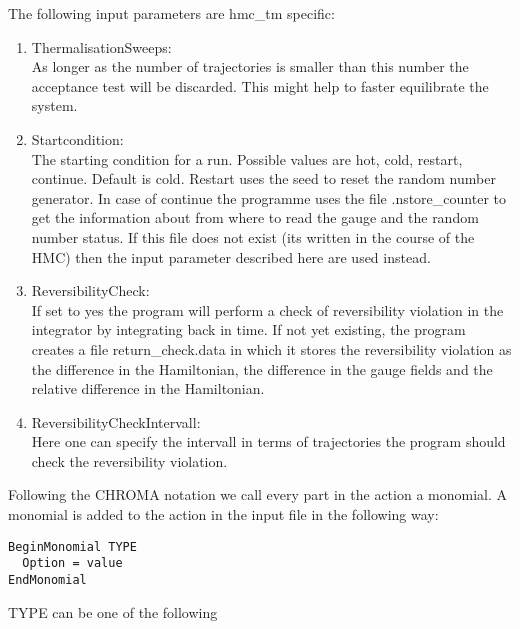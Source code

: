 The following input parameters are {\ttfamily hmc\_tm} specific:
\begin{enumerate}
\item {ThermalisationSweeps}:\\
  As longer as the number of trajectories is smaller than this number
  the acceptance test will be discarded. This might help to faster
  equilibrate the system.

\item {\ttfamily Startcondition}:\\
  The starting condition for a run. Possible values are {\ttfamily
    hot, cold, restart, continue}. Default is {\ttfamily
    cold}. Restart uses the seed to reset the random number
  generator. In case of {\ttfamily continue} the programme uses the
  file {\ttfamily .nstore\_counter} to get the information about from
  where to read the gauge and the random number status. If this file
  does not exist (its written in the course of the HMC) then the input
  parameter described here are used instead.

\item {\ttfamily ReversibilityCheck}:\\
  If set to {\ttfamily yes} the program will perform a check of
  reversibility violation in the integrator by integrating back in
  time. If not yet existing, the program creates a file {\ttfamily
    return\_check.data} in which it stores the reversibility violation
  as the difference in the Hamiltonian, the difference in the gauge
  fields and the relative difference in the Hamiltonian.

\item {\ttfamily ReversibilityCheckIntervall}:\\
  Here one can specify the intervall in terms of trajectories the
  program should check the reversibility violation.

\end{enumerate}
Following the CHROMA notation we call every part in the action a
monomial. A monomial is added to the action in the input file in the
following way:
\begin{verbatim}
BeginMonomial TYPE
  Option = value
EndMonomial
\end{verbatim}
{\ttfamily TYPE} can be one of the following
